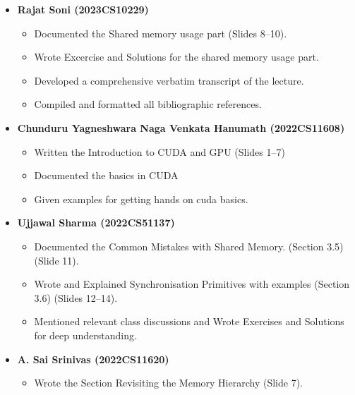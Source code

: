 \begin{itemize}
    \item \textbf{Rajat Soni (2023CS10229)} \begin{itemize}
        \item Documented the Shared memory usage part (Slides 8--10).
        \item Wrote Excercise and Solutions for the shared memory usage part.
        \item Developed a comprehensive verbatim transcript of the lecture.
        \item Compiled and formatted all bibliographic references.
    \end{itemize}
    \item \textbf{Chunduru Yagneshwara Naga Venkata Hanumath (2022CS11608)}
    \begin{itemize}
        \item Written the Introduction to CUDA and GPU (Slides 1--7)
        \item Documented the basics in CUDA
        \item Given examples for getting hands on cuda basics.
    \end{itemize}
     \item \textbf{Ujjawal Sharma (2022CS51137)}   \begin{itemize}
        \item Documented the Common Mistakes with Shared Memory. (Section 3.5) (Slide 11).
        \item Wrote and Explained Synchronisation Primitives with examples (Section 3.6) (Slides 12--14).
        \item Mentioned relevant class discussions and Wrote Exercises and Solutions for deep understanding.
    \end{itemize}
     \item \textbf{A. Sai Srinivas (2022CS11620)}   \begin{itemize}
        \item Wrote the Section Revisiting the Memory Hierarchy (Slide 7).
    \end{itemize}
    
\end{itemize}